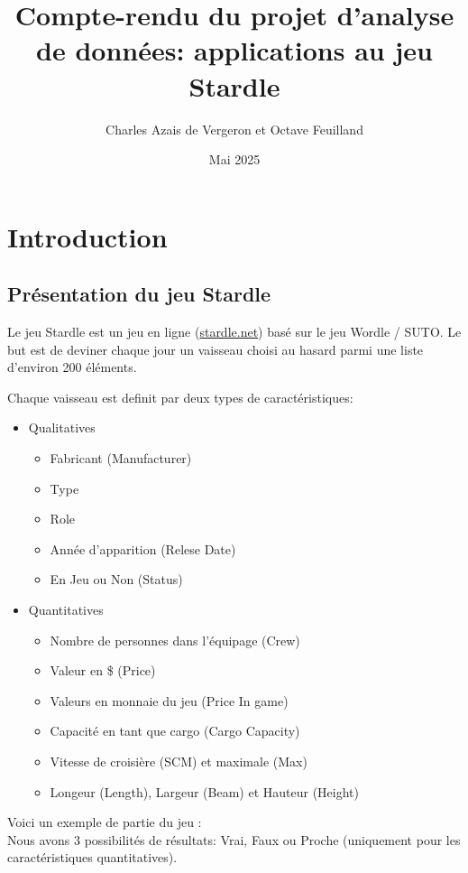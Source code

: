 \documentclass{article}
\title{Compte-rendu du projet d'analyse de données: applications au jeu Stardle}
\author{Charles Azais de Vergeron et Octave Feuilland }
\date{Mai 2025}
\begin{document}
\maketitle

\section{Introduction}
\subsection{Présentation du jeu Stardle}

Le jeu Stardle est un jeu en ligne (\href{https://stardle.net}{stardle.net}) basé sur le jeu Wordle / SUTO. 
Le but est de deviner chaque jour un vaisseau choisi au hasard parmi une liste  d'environ 200 éléments. 

Chaque vaisseau est definit par deux types de caractéristiques: 
\begin{itemize}
    \item Qualitatives
    \begin{itemize}
        \item Fabricant (Manufacturer)
        \item Type
        \item Role 
        \item Année d'apparition (Relese Date)
        \item En Jeu ou Non (Status)
    \end{itemize}
    \item Quantitatives
    \begin{itemize}
        \item Nombre de personnes dans l'équipage (Crew)
        \item Valeur en \$ (Price)
        \item Valeurs en monnaie du jeu (Price In game)
        \item Capacité en tant que cargo (Cargo Capacity)
        \item Vitesse de croisière (SCM) et maximale (Max)
        \item Longeur (Length), Largeur (Beam) et Hauteur (Height)
    \end{itemize}
\end{itemize}

Voici un exemple de partie du jeu : \\


Nous avons 3 possibilités de résultats: Vrai, Faux ou Proche (uniquement pour les caractéristiques quantitatives).
\end{document}
